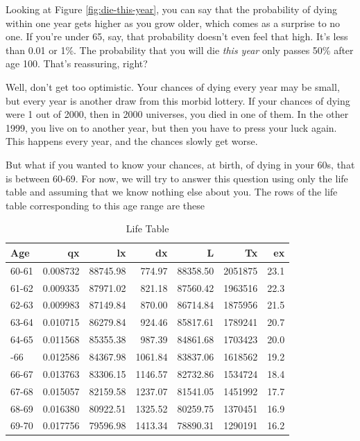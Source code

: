 \documentclass[openany]{book}
\begin{document}
Looking at Figure \ref{fig:die-this-year}, you can say that the probability of dying within one year gets higher as you grow older, which comes as a surprise to no one. If you're under 65, say, that probability doesn't even feel that high. It's less than 0.01 or 1\%. The probability that you will die \emph{this year} only passes 50\% after age 100. That's reassuring, right?

Well, don't get too optimistic. Your chances of dying every year may be small, but every year is another draw from this morbid lottery. If your chances of dying were 1 out of 2000, then in 2000 universes, you died in one of them. In the other 1999, you live on to another year, but then you have to press your luck again. This happens every year, and the chances slowly get worse.

But what if you wanted to know your chances, at birth, of dying in your 60s, that is between 60-69. For now, we will try to answer this question using only the life table and assuming that we know nothing else about you. The rows of the life table corresponding to this age range are these

\begin{table}[!h]

\caption{\label{tab:survival}Life Table}
\centering
\begin{tabular}[t]{lrrrrrr}
\toprule
Age & qx & lx & dx & L & Tx & ex\\
\midrule
60-61 & 0.008732 & 88745.98 & 774.97 & 88358.50 & 2051875 & 23.1\\
61-62 & 0.009335 & 87971.02 & 821.18 & 87560.42 & 1963516 & 22.3\\
62-63 & 0.009983 & 87149.84 & 870.00 & 86714.84 & 1875956 & 21.5\\
63-64 & 0.010715 & 86279.84 & 924.46 & 85817.61 & 1789241 & 20.7\\
64-65 & 0.011568 & 85355.38 & 987.39 & 84861.68 & 1703423 & 20.0\\
\addlinespace
65-66 & 0.012586 & 84367.98 & 1061.84 & 83837.06 & 1618562 & 19.2\\
66-67 & 0.013763 & 83306.15 & 1146.57 & 82732.86 & 1534724 & 18.4\\
67-68 & 0.015057 & 82159.58 & 1237.07 & 81541.05 & 1451992 & 17.7\\
68-69 & 0.016380 & 80922.51 & 1325.52 & 80259.75 & 1370451 & 16.9\\
69-70 & 0.017756 & 79596.98 & 1413.34 & 78890.31 & 1290191 & 16.2\\
\bottomrule
\end{tabular}
\end{table}
\end{document}
